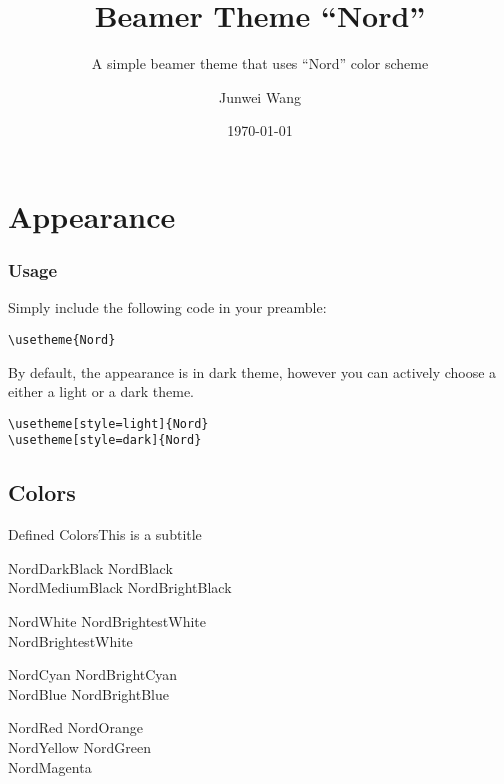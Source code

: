 \documentclass[compress, aspectratio=169]{beamer}
\title{Beamer Theme ``Nord''}
\subtitle{A simple beamer theme that uses ``Nord'' color scheme}
\author{Junwei Wang}
\institute{CryptoExperts}
\date{\today}
\begin{document}
\begin{frame}
  \maketitle
\end{frame}


\section{Appearance}


\begin{frame}[fragile]
  \frametitle{Usage}
  Simply include the following code in your preamble:

  \begin{lstlisting}[basicstyle = \ttfamily\small]
\usetheme{Nord}
  \end{lstlisting}

  \bigskip

  By default, the appearance is in dark theme, however you can actively choose a either a light or a
  dark theme.

  \begin{lstlisting}[basicstyle = \ttfamily\small]
\usetheme[style=light]{Nord}
\usetheme[style=dark]{Nord}
  \end{lstlisting}

\end{frame}

\subsection{Colors}

\begin{frame}{Defined Colors}{This is a subtitle}
  \begin{description}
  \item[Polar Night]
    \textcolor{NordDarkBlack}{NordDarkBlack} \quad \textcolor{NordBlack}{NordBlack}\\
    \textcolor{NordMediumBlack}{NordMediumBlack} \quad \textcolor{NordBrightBlack}{NordBrightBlack}
  \item[Snow Storm]
    \textcolor{NordWhite}{NordWhite} \quad \textcolor{NordBrighterWhite}{NordBrightestWhite}\\
    \textcolor{NordBrightestWhite}{NordBrightestWhite}
  \item[Forest]
    \textcolor{NordCyan}{NordCyan} \quad \textcolor{NordBrightCyan}{NordBrightCyan}\\
    \textcolor{NordBlue}{NordBlue} \quad \textcolor{NordBrightBlue}{NordBrightBlue}
  \item[Aurora]
    \textcolor{NordRed}{NordRed} \quad \textcolor{NordOrange}{NordOrange} \\
    \textcolor{NordYellow}{NordYellow} \quad \textcolor{NordGreen}{NordGreen} \\
    \textcolor{NordMagenta}{NordMagenta}
  \end{description}
\end{frame}
\end{document}
